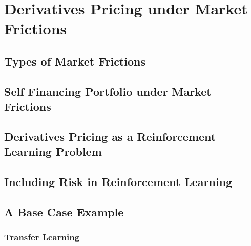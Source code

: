\chapter{Derivatives Pricing under Market Frictions}
\label{chap:MktFrictions}

\section{Types of Market Frictions}
\section{Self Financing Portfolio under Market Frictions}

\section{Derivatives Pricing as a Reinforcement Learning Problem}

\section{Including Risk in Reinforcement Learning}

\section{A Base Case Example}

\subsection{Transfer Learning}
